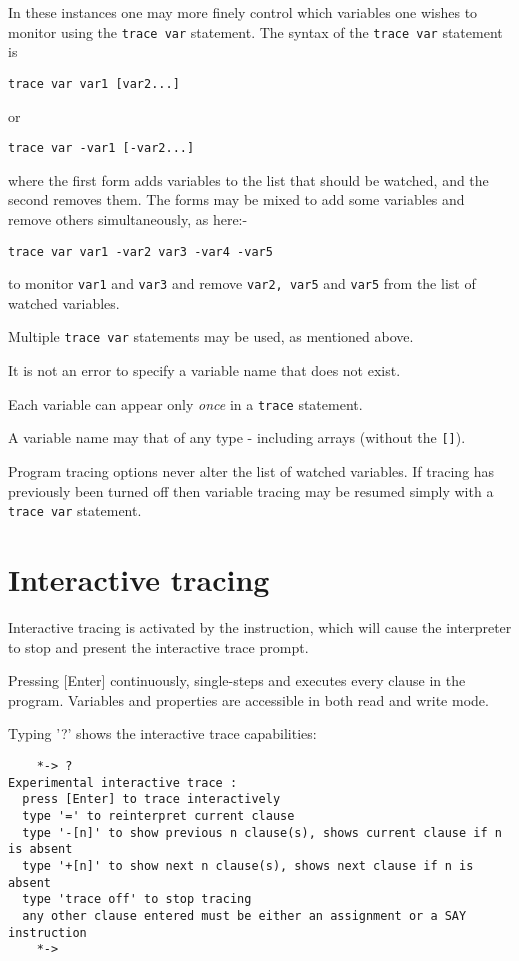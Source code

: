{In these instances one may more finely control which variables one wishes to monitor using the \texttt{trace var} statement.
The syntax of the \texttt{trace var} statement is 
\begin{verbatim}
trace var var1 [var2...]
\end{verbatim}
or
\begin{verbatim}
trace var -var1 [-var2...]
\end{verbatim}
where the first form adds variables to the list that should be watched, and the second removes them. The forms may be mixed to add some variables and remove others simultaneously, as here:-
\begin{verbatim}
trace var var1 -var2 var3 -var4 -var5
\end{verbatim}
to  monitor \texttt{var1} and \texttt{var3} and remove \texttt{var2, var5} and \texttt{var5} from the list of watched variables. 

Multiple \texttt{trace var} statements may be used, as mentioned above.

It is not an error to specify a variable name that does not exist.

Each variable can appear only \textit{once} in a \texttt{trace} statement.

A variable name may that of any type - including arrays (without the \texttt{[]}).

Program tracing options never alter the list of watched variables. If tracing has previously been turned off then variable tracing may be resumed simply with a \texttt{trace var} statement.

\section{Interactive tracing}

Interactive tracing is activated by the  instruction, 
which will cause the interpreter to stop and present the interactive 
trace prompt. 

Pressing [Enter] continuously, single-steps and executes 
every clause in the program. Variables and properties are accessible in 
both read and write mode.

Typing '?' shows the interactive trace capabilities:
\begin{lstlisting}
    *-> ?
Experimental interactive trace :
  press [Enter] to trace interactively
  type '=' to reinterpret current clause
  type '-[n]' to show previous n clause(s), shows current clause if n is absent
  type '+[n]' to show next n clause(s), shows next clause if n is absent
  type 'trace off' to stop tracing
  any other clause entered must be either an assignment or a SAY instruction
    *-> 
\end{lstlisting}

}
